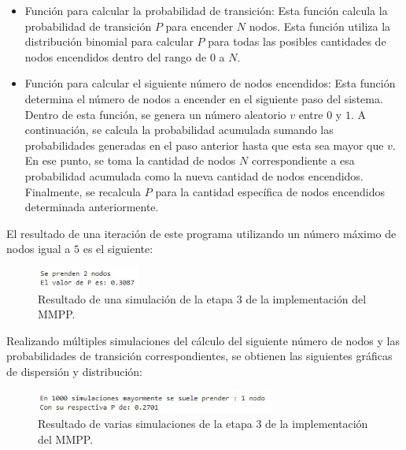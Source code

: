 \begin{enumerate}[label=\arabic*.]
\begin{itemize}
    \item Función para calcular la probabilidad de transición: Esta función calcula la probabilidad de transición $P$ para encender $N$ nodos. Esta función utiliza la distribución binomial para calcular $P$ para todas las posibles cantidades de nodos encendidos dentro del rango de $0$ a $N$.

    \item Función para calcular el siguiente número de nodos encendidos: Esta función determina el número de nodos a encender en el siguiente paso del sistema. Dentro de esta función, se genera un número aleatorio $v$ entre $0$ y $1$. A continuación, se calcula la probabilidad acumulada sumando las probabilidades generadas en el paso anterior hasta que esta sea mayor que $v$. En ese punto, se toma la cantidad de nodos $N$ correspondiente a esa probabilidad acumulada como la nueva cantidad de nodos encendidos. Finalmente, se recalcula $P$ para la cantidad específica de nodos encendidos determinada anteriormente.
\end{itemize}

El resultado de una iteración de este programa utilizando un número máximo de nodos igual a $5$ es el siguiente:

\begin{figure}[H]
    \centering
    \includegraphics[width=0.3\textwidth]{imagenes/mmpp3.1.jpg}
    \caption{Resultado de una simulación de la etapa 3 de la implementación del MMPP.}
\end{figure}

Realizando múltiples simulaciones del cálculo del siguiente número de nodos y las probabilidades de transición correspondientes, se obtienen las siguientes gráficas de dispersión y distribución:

\begin{figure}[H]
    \centering
    \includegraphics[width=0.7\textwidth]{imagenes/mmpp3.2.jpg}
    \caption{Resultado de varias simulaciones de la etapa 3 de la implementación del MMPP.}
\end{figure}
\newpage


\end{enumerate}
